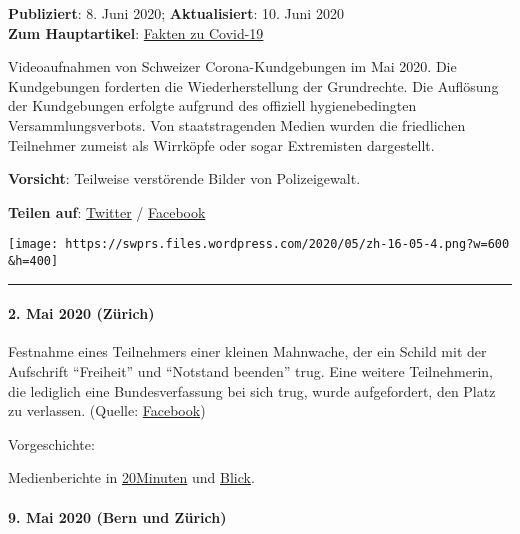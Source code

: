 \textbf{Publiziert}: 8. Juni 2020; \textbf{Aktualisiert}: 10. Juni
2020\\
\textbf{Zum Hauptartikel}:
\href{https://swprs.org/covid-19-hinweis-ii/}{Fakten zu Covid-19}

Videoaufnahmen von Schweizer Corona-Kundgebungen im Mai 2020. Die
Kundgebungen forderten die Wiederherstellung der Grundrechte. Die
Auflösung der Kundgebungen erfolgte aufgrund des offiziell
hygienebedingten Versammlungsverbots. Von staatstragenden Medien wurden
die friedlichen Teilnehmer zumeist als Wirrköpfe oder sogar Extremisten
dargestellt.

\textbf{Vorsicht}: Teilweise verstörende Bilder von Polizeigewalt.

\textbf{Teilen auf}:
\href{https://twitter.com/intent/tweet?url=https://swprs.org/corona-repression-in-der-schweiz/}{Twitter}
/
\href{https://www.facebook.com/share.php?u=https://swprs.org/corona-repression-in-der-schweiz/}{Facebook}

\texttt{[image: https://swprs.files.wordpress.com/2020/05/zh-16-05-4.png?w=600\\\&h=400]}

\begin{center}\rule{0.5\linewidth}{\linethickness}\end{center}

\hypertarget{2-mai-2020-zuxfcrich}{%
\paragraph{2. Mai 2020 (Zürich)}\label{2-mai-2020-zuxfcrich}}

Festnahme eines Teilnehmers einer kleinen Mahnwache, der ein Schild mit
der Aufschrift ``Freiheit'' und ``Notstand beenden'' trug. Eine weitere
Teilnehmerin, die lediglich eine Bundesverfassung bei sich trug, wurde
aufgefordert, den Platz zu verlassen. (Quelle:
\href{https://www.facebook.com/groups/646775362045508/permalink/3151838291539190/}{Facebook})

Vorgeschichte:

Medienberichte in
\href{https://www.20min.ch/story/polizei-verhaftet-teilnehmer-von-anti-corona-kundgebung-802971760222}{20Minuten}
und
\href{https://www.blick.ch/news/schweiz/zuerich/kurzer-einsatz-polizei-loest-versammlung-in-zuerich-auf-id15872505.html}{Blick}.

\hypertarget{9-mai-2020-bern-und-zuxfcrich}{%
\paragraph{9. Mai 2020 (Bern und
Zürich)}\label{9-mai-2020-bern-und-zuxfcrich}}


